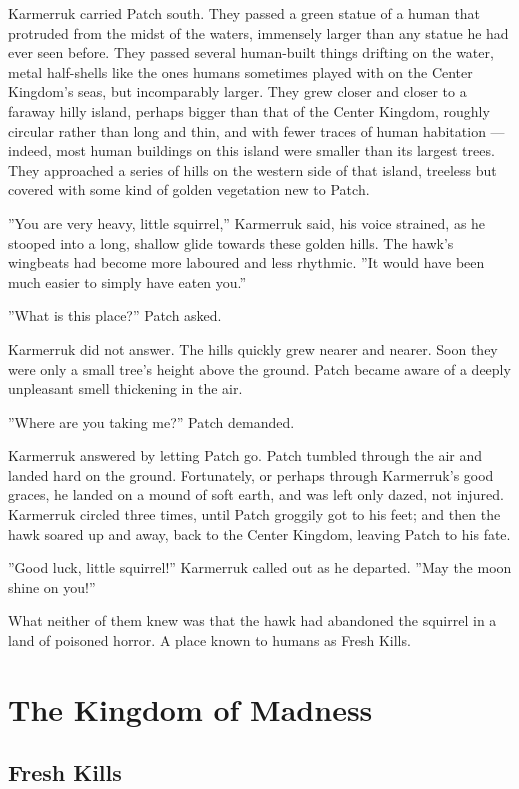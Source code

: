 \documentclass[12pt]{book}
\begin{document}
Karmerruk carried Patch south. They passed a green statue of a human that protruded from the midst of the waters, immensely larger than any statue he had ever seen before. They passed several human-built things drifting on the water, metal half-shells like the ones humans sometimes played with on the Center Kingdom's seas, but incomparably larger. They grew closer and closer to a faraway hilly island, perhaps bigger than that of the Center Kingdom, roughly circular rather than long and thin, and with fewer traces of human habitation ---
indeed, most human buildings on this island were smaller than its largest trees. They approached a series of hills on the western side of that island, treeless but covered with some kind of golden vegetation new to Patch.

''You are very heavy, little squirrel,'' Karmerruk said, his voice strained, as he stooped into a long, shallow glide towards these golden hills. The hawk's wingbeats had become more laboured and less rhythmic. ''It would have been much easier to simply have eaten you.''

''What is this place?'' Patch asked.

Karmerruk did not answer. The hills quickly grew nearer and nearer. Soon they were only a small tree's height above the ground. Patch became aware of a deeply unpleasant smell thickening in the air.

''Where are you taking me?'' Patch demanded.

Karmerruk answered by letting Patch go. Patch tumbled through the air and landed hard on the ground. Fortunately, or perhaps through Karmerruk's good graces, he landed on a mound of soft earth, and was left only dazed, not injured. Karmerruk circled three times, until Patch groggily got to his feet; and then the hawk soared up and away, back to the Center Kingdom, leaving Patch to his fate.

''Good luck, little squirrel!'' Karmerruk called out as he departed. ''May the moon shine on you!''

What neither of them knew was that the hawk had abandoned the squirrel in a land of poisoned horror. A place known to humans as Fresh Kills.



\chapter{The Kingdom of Madness}

\section{Fresh Kills}
\end{document}
